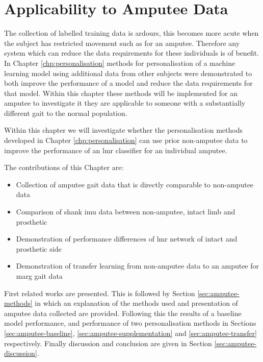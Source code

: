 \chapter{Applicability to Amputee Data}
\label{chp:amputee-data}

The collection of labelled training data is ardours, this becomes more acute when the subject has restricted movement such as for an amputee. Therefore any system which can reduce the data requirements for these individuals is of benefit. In Chapter \ref{chp:personalisation} methods for personalisation of a machine learning model using additional data from other subjects were demonstrated to both improve the performance of a model and reduce the data requirements for that model. Within this chapter these methods will be implemented for an amputee to investigate it they are applicable to someone with a substantially different gait to the normal population.

Within this chapter we will investigate whether the personalisation methods developed in Chapter \ref{chp:personalisation} can use prior non-amputee data to improve the performance of an \acrshort{lmr} classifier for an individual amputee.

The contributions of this Chapter are:
\begin{itemize}
    \item Collection of amputee gait data that is directly comparable to non-amputee data
    \item Comparison of shank \acrshort{imu} data between non-amputee, intact limb and prosthetic
    \item Demonstration of performance differences of \acrshort{lmr} network of intact and prosthetic side
    \item Demonstration of transfer learning from non-amputee data to an amputee for \acrshort{marg} gait data
\end{itemize}

First related works are presented. This is followed by Section \ref{sec:amputee-methods} in which an explanation of the methods used and presentation of amputee data collected are provided. Following this the results of a baseline model performance, and performance of two personalisation methods in Sections \ref{sec:amputee-baseline}, \ref{sec:amputee-supplementation} and \ref{sec:amputee-transfer} respectively. Finally discussion and conclusion are given in Section \ref{sec:amputee-discussion}.


